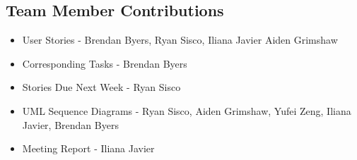 \documentclass[12pt]{article}
\begin{document}
\subsection{Team Member Contributions}

\begin{itemize}
  \item User Stories - Brendan Byers, Ryan Sisco, Iliana Javier Aiden Grimshaw
  \item Corresponding Tasks - Brendan Byers
  \item Stories Due Next Week - Ryan Sisco
  \item UML Sequence Diagrams - Ryan Sisco, Aiden Grimshaw, Yufei Zeng, Iliana Javier, Brendan Byers
  \item Meeting Report -  Iliana Javier
\end{itemize}
\end{document}
